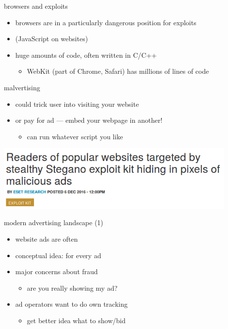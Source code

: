 \begin{frame}{browsers and exploits}
    \begin{itemize}
    \item browsers are in a particularly dangerous position for exploits
    \item {} (JavaScript on websites)
    \item huge amounts of code, often written in C/C++
        \begin{itemize}
            \item WebKit (part of Chrome, Safari) has millions of lines of code
        \end{itemize}
    \end{itemize}
\end{frame}

\begin{frame}{malvertising}
    \begin{itemize}
    \item could trick user into visiting your website
        \vspace{.5cm}
    \item or pay for ad --- embed your webpage in another!
        \begin{itemize}
        \item can run whatever script you like
        \end{itemize}
    \end{itemize}
    \includegraphics[width=0.9\textwidth]{malvert-stegano}
\end{frame}

\begin{frame}{modern advertising landscape (1)}
    \begin{itemize}
        \item website ads are often 
        \item conceptual idea:  for every ad
        \item major concerns about fraud
            \begin{itemize}
            \item are you really showing my ad?
            \end{itemize}
        \item ad operators want to do own tracking
            \begin{itemize}
            \item get better idea what to show/bid
            \end{itemize}
    \end{itemize}
\end{frame}

